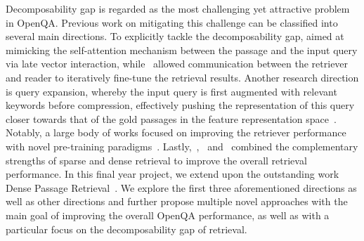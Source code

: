 %
Decomposability gap is regarded as the most challenging yet attractive problem in OpenQA.
%
Previous work on mitigating this challenge can be classified into several main directions.
%
To explicitly tackle the decomposability gap, \citet{khattab2020colbert} aimed at mimicking the self-attention mechanism between the passage and the input query via late vector interaction, while~\citet{das2018multi} allowed communication between the retriever and reader to iteratively fine-tune the retrieval results.
%
Another research direction is query expansion, whereby the input query is first augmented with relevant keywords before compression, effectively pushing the representation of this query closer towards that of the gold passages in the feature representation space~\cite{mao2021generation, qi2019answering}.
%
Notably, a large body of works focused on improving the retriever performance with novel pre-training paradigms~\cite{lee2019latent, guu2020realm, lewis2020retrieval, chang2020pre, lewis2020pre, xiong2021progressively}.
%
Lastly,~\citet{seo2019real},~\citet{lee2020contextualized} and~\citet{luan2021sparse} combined the complementary strengths of sparse and dense retrieval to improve the overall retrieval performance.
%
In this final year project, we extend upon the outstanding work Dense Passage Retrieval~\cite{karpukhin2020dense}.
%
We explore the first three aforementioned directions as well as other directions and further propose multiple novel approaches with the main goal of improving the overall OpenQA performance, as well as with a particular focus on the decomposability gap of retrieval.







